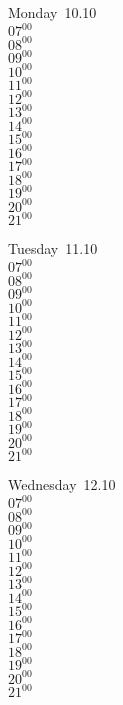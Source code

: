 \documentclass[11pt,a4paper]{book}\usepackage[]{graphicx}\usepackage[]{color}
\begin{document}
\begin{headerbox}
\end{headerbox}
\begin{weekdaybox}
  Monday~10.10\\
  { 
  \vfill
  $07^{00}$\\
$08^{00}$\\
$09^{00}$\\
$10^{00}$\\
$11^{00}$\\
$12^{00}$\\
$13^{00}$\\
$14^{00}$\\
$15^{00}$\\
$16^{00}$\\
$17^{00}$\\
$18^{00}$\\
$19^{00}$\\
$20^{00}$\\
$21^{00}$\\
  }
\end{weekdaybox}
\begin{weekdaybox}
  Tuesday~11.10\\
  { 
  \vfill
  $07^{00}$\\
$08^{00}$\\
$09^{00}$\\
$10^{00}$\\
$11^{00}$\\
$12^{00}$\\
$13^{00}$\\
$14^{00}$\\
$15^{00}$\\
$16^{00}$\\
$17^{00}$\\
$18^{00}$\\
$19^{00}$\\
$20^{00}$\\
$21^{00}$\\
  }
\end{weekdaybox}
\begin{weekdaybox}
  Wednesday~12.10\\
  { 
  \vfill
  $07^{00}$\\
$08^{00}$\\
$09^{00}$\\
$10^{00}$\\
$11^{00}$\\
$12^{00}$\\
$13^{00}$\\
$14^{00}$\\
$15^{00}$\\
$16^{00}$\\
$17^{00}$\\
$18^{00}$\\
$19^{00}$\\
$20^{00}$\\
$21^{00}$\\
  }
\end{weekdaybox}
\end{document}
